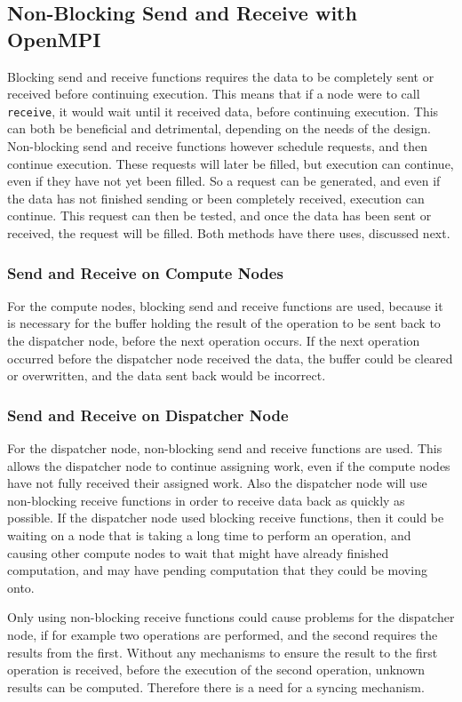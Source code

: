 \subsection{Non-Blocking Send and Receive with OpenMPI}
Blocking send and receive functions requires the data to be completely sent or received before continuing execution. This means that if a node were to call \verb|receive|, it would wait until it received data, before continuing execution. This can both be beneficial and detrimental, depending on the needs of the design. Non-blocking send and receive functions however schedule requests, and then continue execution. These requests will later be filled, but execution can continue, even if they have not yet been filled. So a request can be generated, and even if the data has not finished sending or been completely received, execution can continue. This request can then be tested, and once the data has been sent or received, the request will be filled. Both methods have there uses, discussed next.

\subsubsection{Send and Receive on Compute Nodes}
For the compute nodes, blocking send and receive functions are used, because it is necessary for the buffer holding the result of the operation to be sent back to the dispatcher node, before the next operation occurs. If the next operation occurred before the dispatcher node received the data, the buffer could be cleared or overwritten, and the data sent back would be incorrect.

\subsubsection{Send and Receive on Dispatcher Node}
For the dispatcher node, non-blocking send and receive functions are used. This allows the dispatcher node to continue assigning work, even if the compute nodes have not fully received their assigned work. Also the dispatcher node will use non-blocking receive functions in order to receive data back as quickly as possible. If the dispatcher node used blocking receive functions, then it could be waiting on a node that is taking a long time to perform an operation, and causing other compute nodes to wait that might have already finished computation, and may have pending computation that they could be moving onto. 

Only using non-blocking receive functions could cause problems for the dispatcher node, if for example two operations are performed, and the second requires the results from the first. Without any mechanisms to ensure the result to the first operation is received, before the execution of the second operation, unknown results can be computed. Therefore there is a need for a syncing mechanism.

